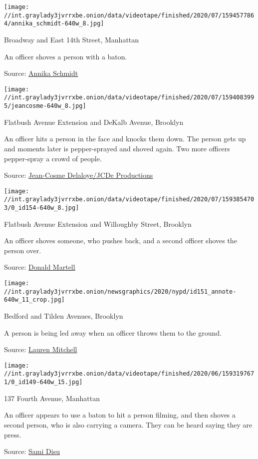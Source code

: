 \texttt{[image: //int.graylady3jvrrxbe.onion/data/videotape/finished/2020/07/1594577864/annika\_schmidt-640w\_8.jpg]}

 Broadway and East 14th Street, Manhattan

 An officer shoves a person with a baton.

Source:
\href{https://twitter.com/annikahouse/status/1266931806563176451}{Annika
Schmidt}

\texttt{[image: //int.graylady3jvrrxbe.onion/data/videotape/finished/2020/07/1594083995/jeancosme-640w\_8.jpg]}

 Flatbush Avenue Extension and DeKalb Avenue, Brooklyn

 An officer hits a person in the face and knocks them down. The person
gets up and moments later is pepper-sprayed and shoved again. Two more
officers pepper-spray a crowd of people.

Source:
\href{https://twitter.com/jeancosme/status/1266938900184006656}{Jean-Cosme
Delaloye/JCDe Productions}

\texttt{[image: //int.graylady3jvrrxbe.onion/data/videotape/finished/2020/07/1593854703/0\_id154-640w\_8.jpg]}

 Flatbush Avenue Extension and Willoughby Street, Brooklyn

 An officer shoves someone, who pushes back, and a second officer shoves
the person over.

Source:
\href{https://twitter.com/DonnyMartell/status/1266943106429128711}{Donald
Martell}

\texttt{[image: //int.graylady3jvrrxbe.onion/newsgraphics/2020/nypd/id151\_annote-640w\_11\_crop.jpg]}

 Bedford and Tilden Avenues, Brooklyn

 A person is being led away when an officer throws them to the ground.

Source:
\href{https://twitter.com/justawren/status/1266945853828280330}{Lauren
Mitchell}

\texttt{[image: //int.graylady3jvrrxbe.onion/data/videotape/finished/2020/06/1593197671/0\_id149-640w\_15.jpg]}

 137 Fourth Avenue, Manhattan

 An officer appears to use a baton to hit a person filming, and then
shoves a second person, who is also carrying a camera. They can be heard
saying they are press.

Source:
\href{https://www.facebookcorewwwi.onion/sami.disu/videos/10219696654859962/}{Sami
Disu}

